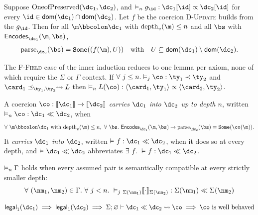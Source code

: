 \vspace{1em}
\begin{lemma}\label{lem:msg-from-fields}
  Suppose $\mathrm{OneofPreserved}(\dc_1, \dc_2)$, and
  $\semjudg[n]{g_{\id} : \dc_1[\id] \fieldrel \dc_2[\id]}$ for every
  $\id \in \dom{\dc_1} \cap \dom{\dc_2}$. Let $f$ be the coercion
  \textsc{D-Update} builds from the $g_{\id}$. Then for all
  $\validv{\m}{\dc_1}$ with $\mathrm{depth}_v(\m) \le n$ and all $\bs$ with
  $\encodes{\dc_1}(\m, \bs)$,
  \[ \mathrm{parse}_{\dc_2}(\bs) = \some{(f(\m), U)} \quad\text{with}\quad
     U \subseteq \dom{\dc_1} \setminus \dom{\dc_2}. \]
\end{lemma}

The \textsc{F-Field} case of the inner induction reduces to one lemma per axiom,
none of which require the $\Sigma$ or $\Gamma$ context. If
$\forall\ j \le n. \semjudg[j]{\co : \ty_1 \typrel \ty_2}$ and
$\card_1 \cardrel{\ty_1}{\ty_2} \coerce L$ then
$\semjudg[n]{L(\co) : \field{\card_1}{\ty_1} \fieldrel \field{\card_2}{\ty_2}}$.

\vspace{1em}
\begin{definition}\label{def:sem-compat}
  A coercion $\co : \denote{\dc_1} \rightarrow \denote{\dc_2}$ \emph{carries $\dc_1$ into
  $\dc_2$ up to depth $n$}, written $\semjudg[n]{\co : \dc_1 \dcompat \dc_2}$, when
  \[ \forall\ \validv{\m}{\dc_1} \text{ with } \mathrm{depth}_v(\m) \le n,\
    \forall\ \bs.\ \encodes{\dc_1}(\m, \bs) \rightarrow
    \mathrm{parse}_{\dc_2}(\bs) = \some{\co(\m)}. \]
  It \emph{carries $\dc_1$ into $\dc_2$}, written $\semjudg{f : \dc_1 \dcompat \dc_2}$, when
  it does so at every depth, and $\semjudg{\dc_1 \dcompat \dc_2}$ abbreviates
  $\exists\ f.\ \semjudg{f : \dc_1 \dcompat \dc_2}$.
\end{definition}

\vspace{1em}
\begin{definition}\label{def:sem-assum}
  $\semjudg[n]{\Gamma}$ holds when every assumed pair is semantically compatible at every
  strictly smaller depth:
  \[ \forall\ (\nm_1, \nm_2) \in \Gamma.\ \forall\ j < n.\ \semjudg[j]{ \coercion{\Sigma(\nm_1)}{\cdot}{\Sigma(\nm_2)} :
      \Sigma(\nm_1) \dcompat \Sigma(\nm_2)} \]
\end{definition}

\vspace{1em}
\begin{definition}[Soundness]\label{def:soundness}
  \[ \legald{\dc_1} \implies \legald{\dc_2} \implies \judg{\emptyset}{\dc_1 \dcompat
      \dc_2 \coerce \co} \implies \co \text{ is well behaved} \]
\end{definition} %

